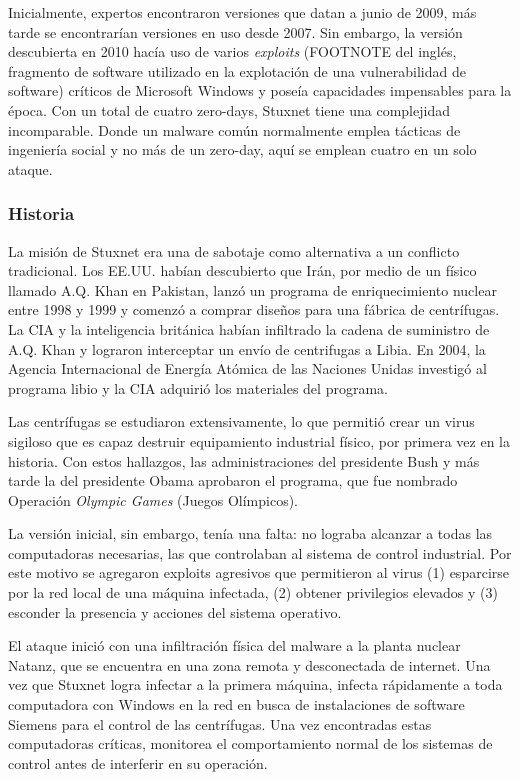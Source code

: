 \documentclass{article}
\begin{document}
Inicialmente, expertos encontraron versiones que datan a junio de 2009, más tarde se encontrarían versiones en uso desde 2007. Sin embargo, la versión descubierta en 2010 hacía uso de varios {\it exploits} (FOOTNOTE del inglés, fragmento de software utilizado en la explotación de una vulnerabilidad de software) críticos de Microsoft Windows y poseía capacidades impensables para la época. Con un total de cuatro zero-days, Stuxnet tiene una complejidad incomparable. Donde un malware común normalmente emplea tácticas de ingeniería social y no más de un zero-day, aquí se emplean cuatro en un solo ataque. \autocite{symantec-stuxnet} \autocite{reuters-stuxnet}

\subsubsection{Historia}
La misión de Stuxnet era una de sabotaje como alternativa a un conflicto tradicional. Los EE.UU. habían descubierto que Irán, por medio de un físico llamado A.Q. Khan en Pakistan, lanzó un programa de enriquecimiento nuclear entre 1998 y 1999 y comenzó a comprar diseños para una fábrica de centrífugas. La CIA y la inteligencia británica habían infiltrado la cadena de suministro de A.Q. Khan y lograron interceptar un envío de centrifugas a Libia. En 2004, la Agencia Internacional de Energía Atómica de las Naciones Unidas investigó al programa libio y la CIA adquirió los materiales del programa.

Las centrífugas se estudiaron extensivamente, lo que permitió crear un virus sigiloso que es capaz destruir equipamiento industrial físico, por primera vez en la historia. Con estos hallazgos, las administraciones del presidente Bush y más tarde la del presidente Obama aprobaron el programa, que fue nombrado Operación {\it Olympic Games} (Juegos Olímpicos).

La versión inicial, sin embargo, tenía una falta: no lograba alcanzar a todas las computadoras necesarias, las que controlaban al sistema de control industrial. Por este motivo se agregaron exploits agresivos que permitieron al virus (1) esparcirse por la red local de una máquina infectada, (2) obtener privilegios elevados y (3) esconder la presencia y acciones del sistema operativo. 

El ataque inició con una infiltración física del malware a la planta nuclear Natanz, que se encuentra en una zona remota y desconectada de internet. Una vez que Stuxnet logra infectar a la primera máquina, infecta rápidamente a toda computadora con Windows en la red en busca de instalaciones de software Siemens para el control de las centrífugas. Una vez encontradas estas computadoras críticas, monitorea el comportamiento normal de los sistemas de control antes de interferir en su operación.
\end{document}
